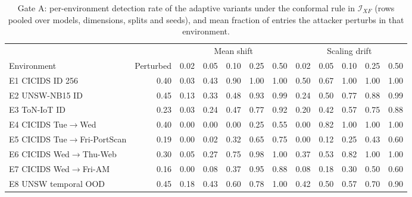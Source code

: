 \begin{table}[!tbp]
\caption{Gate A: per-environment detection rate of the adaptive variants under the conformal rule in $\mathcal I_{XF}$ (rows pooled over models, dimensions, splits and seeds), and mean fraction of entries the attacker perturbs in that environment.}
\label{tab:s-adversarial-env}
\centering
\scriptsize
\setlength{\tabcolsep}{3pt}
\begin{tabular}{@{}lrrrrrrrrrrr@{}}
\toprule
 & & \multicolumn{5}{c}{Mean shift} & \multicolumn{5}{c}{Scaling drift} \\
\cmidrule(lr){3-7}\cmidrule(lr){8-12}
Environment & Perturbed & 0.02 & 0.05 & 0.10 & 0.25 & 0.50 & 0.02 & 0.05 & 0.10 & 0.25 & 0.50 \\
\midrule
E1 CICIDS ID 256 & 0.40 & 0.03 & 0.43 & 0.90 & 1.00 & 1.00 & 0.50 & 0.67 & 1.00 & 1.00 & 1.00 \\
E2 UNSW-NB15 ID & 0.45 & 0.13 & 0.33 & 0.48 & 0.93 & 0.99 & 0.24 & 0.50 & 0.77 & 0.88 & 0.99 \\
E3 ToN-IoT ID & 0.23 & 0.03 & 0.24 & 0.47 & 0.77 & 0.92 & 0.20 & 0.42 & 0.57 & 0.75 & 0.88 \\
E4 CICIDS Tue$\to$Wed & 0.40 & 0.00 & 0.00 & 0.00 & 0.25 & 0.55 & 0.00 & 0.82 & 1.00 & 1.00 & 1.00 \\
E5 CICIDS Tue$\to$Fri-PortScan & 0.19 & 0.00 & 0.02 & 0.32 & 0.65 & 0.75 & 0.00 & 0.12 & 0.25 & 0.43 & 0.60 \\
E6 CICIDS Wed$\to$Thu-Web & 0.30 & 0.05 & 0.27 & 0.75 & 0.98 & 1.00 & 0.37 & 0.53 & 0.82 & 1.00 & 1.00 \\
E7 CICIDS Wed$\to$Fri-AM & 0.16 & 0.00 & 0.08 & 0.37 & 0.95 & 0.88 & 0.08 & 0.18 & 0.30 & 0.50 & 0.60 \\
E8 UNSW temporal OOD & 0.45 & 0.18 & 0.43 & 0.60 & 0.78 & 1.00 & 0.42 & 0.50 & 0.57 & 0.70 & 0.90 \\
\bottomrule
\end{tabular}
\end{table}
